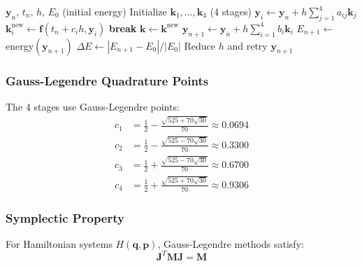 \begin{algorithm}[H]
\caption{Gauss-Legendre Integration Step}
\begin{algorithmic}[1]
\REQUIRE $\mathbf{y}_n$, $t_n$, $h$, $E_0$ (initial energy)
\STATE Initialize $\mathbf{k}_1, \ldots, \mathbf{k}_4$ (4 stages)
        \STATE $\mathbf{y}_i \gets \mathbf{y}_n + h\sum_{j=1}^{4} a_{ij} \mathbf{k}_j$
        \STATE $\mathbf{k}_i^{\text{new}} \gets \mathbf{f}(t_n + c_i h, \mathbf{y}_i)$
    \ENDFOR
        \STATE \textbf{break}
    \ENDIF
    \STATE $\mathbf{k} \gets \mathbf{k}^{\text{new}}$
\ENDFOR
\STATE $\mathbf{y}_{n+1} \gets \mathbf{y}_n + h\sum_{i=1}^{4} b_i \mathbf{k}_i$
\STATE $E_{n+1} \gets$ energy$(\mathbf{y}_{n+1})$ 
\STATE $\Delta E \gets |E_{n+1} - E_0| / |E_0|$
    \STATE Reduce $h$ and retry
\ENDIF
\RETURN $\mathbf{y}_{n+1}$
\end{algorithmic}
\end{algorithm}

\subsubsection{Gauss-Legendre Quadrature Points}

The 4 stages use Gauss-Legendre points:
\begin{align}
c_1 &= \frac{1}{2} - \frac{\sqrt{525 + 70\sqrt{30}}}{70} \approx 0.0694 \\
c_2 &= \frac{1}{2} - \frac{\sqrt{525 - 70\sqrt{30}}}{70} \approx 0.3300 \\
c_3 &= \frac{1}{2} + \frac{\sqrt{525 - 70\sqrt{30}}}{70} \approx 0.6700 \\
c_4 &= \frac{1}{2} + \frac{\sqrt{525 + 70\sqrt{30}}}{70} \approx 0.9306
\end{align}

\subsubsection{Symplectic Property}

For Hamiltonian systems $H(\mathbf{q}, \mathbf{p})$, Gauss-Legendre methods satisfy:
\begin{equation}
    \mathbf{J}^T \mathbf{M} \mathbf{J} = \mathbf{M}
\end{equation}

